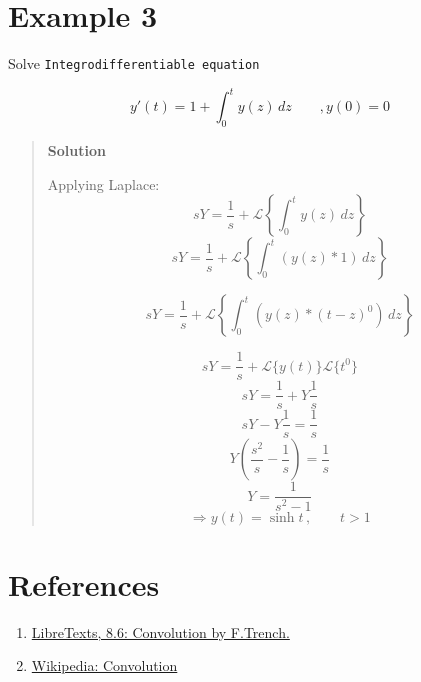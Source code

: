 \documentclass[
  letterpaper,
  DIV=11,
  numbers=noendperiod]{scrreprt}
\theoremstyle{plain}
\theoremstyle{remark}
\begin{document}
\section{Example 3}\label{example-3-3}

\begin{tcolorbox}[enhanced jigsaw, title=\textcolor{quarto-callout-tip-color}{\faLightbulb}\hspace{0.5em}{Example}, colbacktitle=quarto-callout-tip-color!10!white, opacitybacktitle=0.6, opacityback=0, rightrule=.15mm, breakable, titlerule=0mm, colback=white, bottomtitle=1mm, colframe=quarto-callout-tip-color-frame, toprule=.15mm, leftrule=.75mm, toptitle=1mm, arc=.35mm, bottomrule=.15mm, left=2mm, coltitle=black]

Solve \texttt{Integrodifferentiable\ equation}

\[y'(t)=1+\int_0^t y(z)\,dz\qquad, y(0)=0\]

\begin{quote}
\textbf{Solution}

Applying Laplace:
\[sY=\frac{1}{s}+\mathscr{L}\left\{\int_0^t y(z)\,dz\right\}\]
\[sY=\frac{1}{s}+\mathscr{L}\left\{\int_0^t (y(z)*1)\,dz\right\}\]

\[sY=\frac{1}{s}+\mathscr{L}\left\{\int_0^t (y(z)*(t-z)^0)\,dz\right\}\]

\[sY=\frac{1}{s}+\mathscr{L}\{y(t)\}\mathscr{L}\{t^0\}\]
\[sY=\frac{1}{s}+Y\frac{1}{s}\] \[sY-Y\frac{1}{s}=\frac{1}{s}\]
\[Y\left(\frac{s^2}{s}-\frac{1}{s}\right)=\frac{1}{s}\]
\[Y=\frac{1}{s^2-1}\] \[\Rightarrow \boxed{y(t)=\sinh t}\,,\qquad t>1\]
\end{quote}

\end{tcolorbox}

\section{References}\label{references-9}

\begin{enumerate}
\def\labelenumi{\arabic{enumi}.}
\item
  \href{https://math.libretexts.org/Courses/Monroe_Community_College/MTH_225_Differential_Equations/8\%3A_Laplace_Transforms/8.6\%3A_Convolution}{LibreTexts,
  8.6: Convolution by F.Trench.}
\item
  \href{https://en.wikipedia.org/wiki/Convolution}{Wikipedia:
  Convolution}
\end{enumerate}

\end{document}

